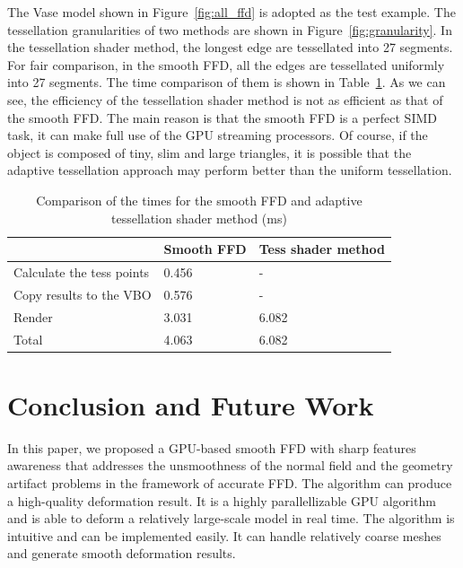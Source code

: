 \documentclass[3p]{elsarticle}
\begin{document}
The Vase model shown in Figure~\ref{fig:all_ffd} is adopted as the test example. The tessellation granularities of two
methods are shown in Figure~\ref{fig:granularity}. In the tessellation shader method, the longest edge are tessellated
into 27 segments. For fair comparison, in the smooth FFD, all the edges are tessellated uniformly into 27 segments. The
time comparison of them is shown in Table~\ref{tab:adaptive_tess}. As we can see, the efficiency of the tessellation
shader method is not as efficient as that of the smooth FFD. The main reason is that the smooth FFD is a perfect SIMD
task, it can make full use of the GPU streaming processors. Of course, if the object is composed of tiny, slim and large
triangles, it is possible that the adaptive tessellation approach may perform better than the uniform tessellation.

\begin{table}[htbp]
	\centering
	\footnotesize
	\caption{Comparison of the times for the smooth FFD and adaptive tessellation shader method (ms)}
		\begin{tabular}{lll}
			\hline
			& Smooth FFD & Tess shader method \\
			\hline
			Calculate the tess points	& 0.456 & -  \\
			Copy results to the VBO		& 0.576 & -  \\
			Render						& 3.031 & 6.082  \\
			Total						& 4.063 & 6.082  \\
			\hline
		\end{tabular}
	\label{tab:adaptive_tess}
\end{table}


\section{Conclusion and Future Work}

In this paper, we proposed a GPU-based smooth FFD with sharp features awareness that addresses the unsmoothness of the
normal field and the geometry artifact problems in the framework of accurate FFD. The algorithm can produce a
high-quality deformation result. It is a highly parallellizable GPU algorithm and is able to deform a relatively
large-scale model in real time. The algorithm is intuitive and can be implemented easily. It can handle relatively
coarse meshes and generate smooth deformation results.
\end{document}

